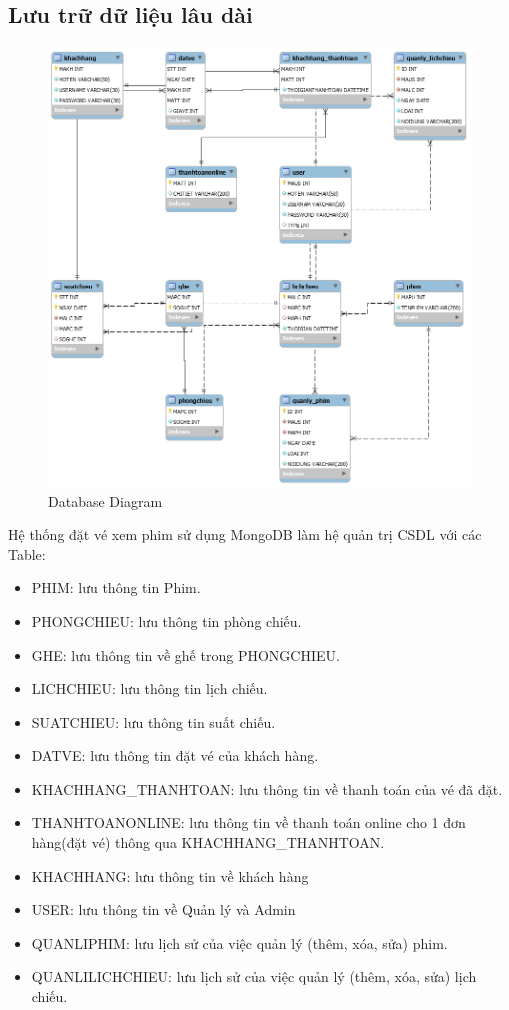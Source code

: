 \documentclass[a4paper, 12pt]{article}
\begin{document}
\subsection{Lưu trữ dữ liệu lâu dài}
\begin{figure}[H]
	\begin{center}
		\includegraphics[scale = 0.5]{image/4.4.png}
		\caption{Database Diagram}
	\end{center}
\end{figure}

Hệ thống đặt vé xem phim sử dụng MongoDB làm hệ quản trị CSDL với các Table:
\begin{itemize}
	\item PHIM: lưu thông tin Phim.
	\item PHONGCHIEU: lưu thông tin phòng chiếu.
	\item GHE: lưu thông tin về ghế trong PHONGCHIEU.
	\item LICHCHIEU: lưu thông tin lịch chiếu.
	\item SUATCHIEU: lưu thông tin suất chiếu.
	\item DATVE: lưu thông tin đặt vé của khách hàng.
	\item KHACHHANG\_THANHTOAN: lưu thông tin về thanh toán của vé đã đặt.
	\item THANHTOANONLINE: lưu thông tin về thanh toán online cho 1 đơn hàng(đặt vé) thông qua KHACHHANG\_THANHTOAN.
	\item KHACHHANG: lưu thông tin về khách hàng
	\item USER: lưu thông tin về Quản lý và Admin
	\item QUANLIPHIM: lưu lịch sử của việc quản lý (thêm, xóa, sửa) phim.
	\item QUANLILICHCHIEU: lưu lịch sử của việc quản lý (thêm, xóa, sửa) lịch chiếu.
\end{itemize}	
\end{document}
